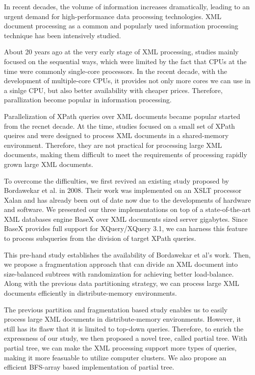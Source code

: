 \begin{abstracts}

In recent decades, the volume of information increases dramatically, leading to
an urgent demand for high-performance data processing technologies. XML document
processing as a common and popularly used information processing technique has
been intensively studied.

About 20 years ago at the very early stage of XML processing, studies mainly
focused on the sequential ways,  which were limited by the fact that CPUs at
the time were commonly single-core processors. In the recent decade, with the
development of multiple-core CPUs, it provides not only more cores we can use
in a sinlge CPU, but also better availability with cheaper prices.  Therefore,
parallization become popular in information processing.

Parallelization of XPath queries over XML documents became popular started from
the recnet decade. At the time, studies focused on a small set of XPath queires
and were designed to process XML documents in a shared-memory environment.
Therefore, they are not practical for processing large XML documents, making
them difficult to meet the requirements of processing rapidly grown large XML
documents.

To overcome the difficulties, we first revived an existing study proposed by
Bordawekar et al. in 2008. Their work was implemented on an XSLT processor Xalan
and has already been out of date now due to the developments of hardware and
software. We presented our three implementations on top of a state-of-the-art
XML databases engine BaseX over XML documents sized server gigabytes. Since
BaseX provides full support for XQuery/XQuery 3.1, we can harness this feature
to process subqueries from the division of target XPath queries.

This pre-hand study establishes the availability of Bordawekar et al's work.
Then, we propose a fragmentation approach that can divide an XML document into
size-balanced subtrees with randomization for achieving better load-balance.
Along with the previous data partitioning strategy, we can process large XML
documents efficiently in distribute-memory environments.

The previous partition and fragmentation based study enables us to easily
process  large XML documents in distribute-memory environments. However, it
still has its  flasw that it is limited to top-down queries. Therefore, to
enrich the expressness  of our study, we then proposed a novel tree, called
partial tree. With partial tree, we can make the XML processing support more
types of queries, making it more feasuable to utilize computer clusters. We also
propose an efficient BFS-array based implementation of partial tree.


\end{abstracts}
